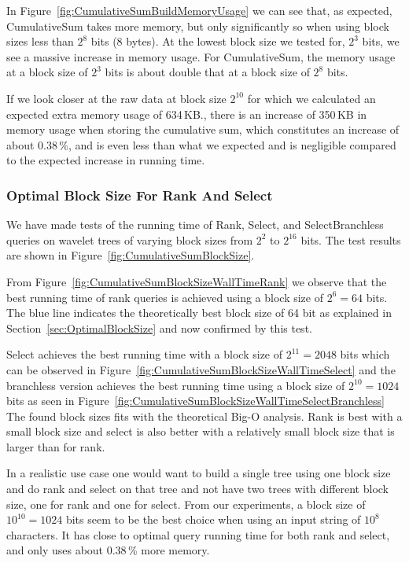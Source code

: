In Figure~\ref{fig:CumulativeSumBuildMemoryUsage} we can see that, as expected, CumulativeSum takes more memory, but only significantly so when using block sizes less than $2^8$ bits (8 bytes).
At the lowest block size we tested for, $2^3$ bits, we see a massive increase in memory usage.
For CumulativeSum, the memory usage at a block size of $2^3$ bits is about double that at a block size of $2^8$ bits.

If we look closer at the raw data at block size $2^{10}$ for which we calculated an expected extra memory usage of 634\,KB., there is an increase of 350\,KB in memory usage when storing the cumulative sum, which constitutes an increase of about 0.38\,\%, and is even less than what we expected and is negligible compared to the expected increase in running time.



\subsubsection{Optimal Block Size For Rank And Select}
\label{sec:OptimalBlockSizeForRankAndSelect}
We have made tests of the running time of Rank, Select, and SelectBranchless queries on wavelet trees of varying block sizes from $2^2$ to $2^{16}$ bits.
The test results are shown in Figure~\ref{fig:CumulativeSumBlockSize}.

From Figure~\ref{fig:CumulativeSumBlockSizeWallTimeRank} we observe that the best running time of rank queries is achieved using a block size of $2^6=64$ bits.
The blue line indicates the theoretically best block size of 64 bit as explained in Section~\ref{sec:OptimalBlockSize} and now confirmed by this test.

Select achieves the best running time with a block size of $2^{11}=2048$ bits which can be observed in Figure~\ref{fig:CumulativeSumBlockSizeWallTimeSelect} and the branchless version achieves the best running time using a block size of $2^{10}=1024$ bits as seen in Figure~\ref{fig:CumulativeSumBlockSizeWallTimeSelectBranchless}
The found block sizes fits with the theoretical Big-O analysis.
Rank is best with a small block size and select is also better with a relatively small block size that is larger than for rank.

In a realistic use case one would want to build a single tree using one block size and do rank and select on that tree and not have two trees with different block size, one for rank and one for select.
From our experiments, a block size of $10^{10}=1024$ bits seem to be the best choice when using an input string of $10^8$ characters.
It has close to optimal query running time for both rank and select, and only uses about 0.38\,\% more memory.

